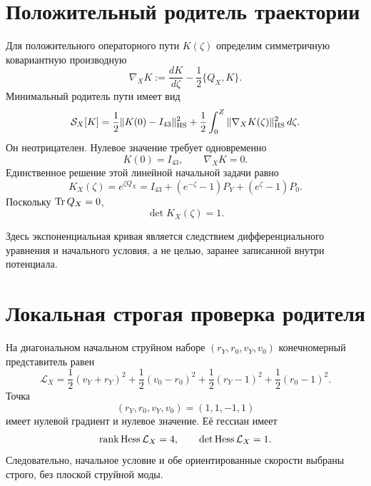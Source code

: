 \section{Положительный родитель траектории}

Для положительного операторного пути $K(\zeta)$ определим симметричную
ковариантную производную
\begin{equation}
 \nabla_XK
 :=\frac{dK}{d\zeta}-\frac12\{Q_X,K\}.
 \label{eq:v10-growth-covariant-derivative}
\end{equation}
Минимальный родитель пути имеет вид
\begin{equation}
 \mathcal S_X[K]
 =\frac12\|K(0)-I_{43}\|_{\rm HS}^2
 +\frac12\int_0^Z\|\nabla_XK(\zeta)\|_{\rm HS}^2\,d\zeta.
 \label{eq:v10-growth-path-parent}
\end{equation}
Он неотрицателен. Нулевое значение требует одновременно
\begin{equation}
 K(0)=I_{43},
 \qquad
 \nabla_XK=0.
 \label{eq:v10-growth-parent-zero-equations}
\end{equation}
Единственное решение этой линейной начальной задачи равно
\begin{equation}
 K_X(\zeta)=e^{\zeta Q_X}
 =I_{43}+(e^{-\zeta}-1)P_Y+(e^{\zeta}-1)P_0.
 \label{eq:v10-growth-parent-solution}
\end{equation}
Поскольку $\operatorname{Tr} Q_X=0$,
\begin{equation}
 \det K_X(\zeta)=1.
 \label{eq:v10-growth-parent-determinant}
\end{equation}

Здесь экспоненциальная кривая является следствием дифференциального
уравнения и начального условия, а не целью, заранее записанной внутри
потенциала.

\section{Локальная строгая проверка родителя}

На диагональном начальном струйном наборе
$(r_Y,r_0,v_Y,v_0)$ конечномерный представитель равен
\begin{equation}
 \mathcal L_X
 =\frac12(v_Y+r_Y)^2+\frac12(v_0-r_0)^2
 +\frac12(r_Y-1)^2+\frac12(r_0-1)^2.
 \label{eq:v10-growth-parent-jet}
\end{equation}
Точка
\begin{equation}
 (r_Y,r_0,v_Y,v_0)=(1,1,-1,1)
 \label{eq:v10-growth-parent-jet-point}
\end{equation}
имеет нулевой градиент и нулевое значение. Её гессиан имеет
\begin{equation}
 \operatorname{rank}\operatorname{Hess}\mathcal L_X=4,
 \qquad
 \det\operatorname{Hess}\mathcal L_X=1.
 \label{eq:v10-growth-parent-jet-hessian}
\end{equation}
Следовательно, начальное условие и обе ориентированные скорости выбраны
строго, без плоской струйной моды.

